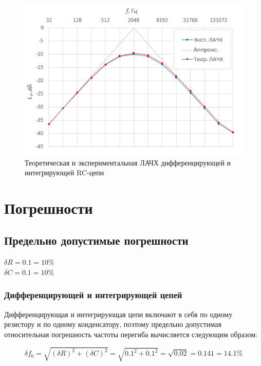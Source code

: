 \setlength{\belowcaptionskip}{0pt} %
\begin{figure}[H]
	\begin{center}
		\includegraphics[width=14cm]{img/3}
		\caption{Теоретическая и экспериментальная ЛАЧХ дифференцирующей и интегрирующей RC-цепи} 
		\label{t:e3} %
	\end{center}
\end{figure}

\section{Погрешности}

\subsection{Предельно допустимые погрешности}
\begin{center}
$\delta R = 0.1 = 10\%$\\
$\delta C = 0.1 = 10\%$\\
\end{center}

\subsubsection{Дифференцирующей и интегрирующей цепей}

Дифференцирующая и интегрирующая цепи включают в себя по одному резистору и по одному конденсатору, поэтому предельно допустимая относительная погрешность частоты перегиба вычисляется следующим образом:

\begin{equation}
\delta f_0 = \sqrt{(\delta R)^2 + (\delta C)^2} = \sqrt{0.1^2 + 0.1^2} = \sqrt{0.02} = 0.141 = 14.1 \%
\end{equation}


